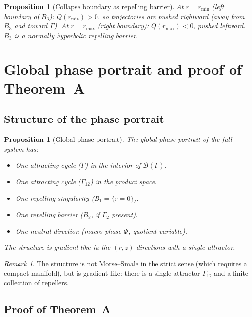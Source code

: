 \documentclass[12pt, oneside]{book}
\theoremstyle{plain}
\newtheorem{proposition}[theorem]{Proposition}
\theoremstyle{definition}
\theoremstyle{remark}
\newtheorem{remark}{Remark}[section]
\newcommand{\Orb}{\Gamma}
\newcommand{\cB}{\mathcal{B}}
\begin{document}
\begin{proposition}[Collapse boundary as repelling barrier]\label{prop:collapse}
At $r=r_{\min}$ (left boundary of $B_3$): $Q(r_{\min})>0$, so
trajectories are pushed rightward (away from $B_3$ and toward $\Orb$).
At $r=r_{\max}$ (right boundary): $Q(r_{\max})<0$, pushed leftward.
$B_3$ is a normally hyperbolic repelling barrier.
\end{proposition}

\section{Global phase portrait and proof of Theorem~A}\label{sec:portrait}

\subsection{Structure of the phase portrait}

\begin{proposition}[Global phase portrait]\label{prop:portrait}
The global phase portrait of the full system has:
\begin{itemize}[leftmargin=*]
  \item One attracting cycle ($\Orb$) in the interior of $\cB(\Orb)$.
  \item One attracting cycle ($\Orb_{12}$) in the product space.
  \item One repelling singularity ($B_1=\{r=0\}$).
  \item One repelling barrier ($B_3$, if $\Orb_2$ present).
  \item One neutral direction (macro-phase $\Phi$, quotient variable).
\end{itemize}
The structure is gradient-like in the $(r,z)$-directions with a
single attractor.
\end{proposition}

\begin{remark}
The structure is not Morse--Smale in the strict sense (which requires
a compact manifold), but is gradient-like: there is a single attractor
$\Orb_{12}$ and a finite collection of repellers.
\end{remark}

\subsection{Proof of Theorem~A}
\end{document}
